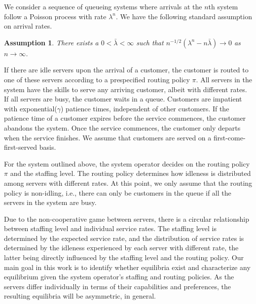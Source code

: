 \documentclass[a4paper,11pt,twoside]{article}
\numberwithin{equation}{section}
\numberwithin{figure}{section}
\theoremstyle{plain}
\newtheorem{assumption}[theorem]{Assumption}
\newcommand{\1}{\mathbbm{1}}
\begin{document}
We consider a sequence of queueing systems where arrivals at the $n$th system follow a Poisson process with rate $\lambda^n$. We have the following standard assumption on arrival rates.
\begin{assumption}\label{asm:lambdascaling}
There exists a $0<\bar{\lambda}<\infty$ such that $n^{-1/2}(\lambda^n-n \bar{\lambda})\to 0$ as $n\to \infty$. 
\end{assumption}
If there are idle servers upon the arrival of a customer, the customer is routed to one of these servers according to a prespecified routing policy $\pi$. All servers in the system have the skills to serve any arriving customer, albeit with different rates. If all servers are busy, the customer waits in a queue. Customers are impatient with exponential($\gamma$) patience times, independent of other customers. If the patience time of a customer expires before the service commences, the customer abandons the system. Once the service commences, the customer only departs when the service finishes. We assume that customers are served on a first-come-first-served basis. 

For the system outlined above, the system operator decides on the routing policy $\pi$ and the staffing level. The routing policy determines how idleness is distributed among servers with different rates. At this point, we only assume that the routing policy is non-idling, i.e., there can only be customers in the queue if all the servers in the system are busy. 

Due to the non-cooperative game between servers, there is a circular relationship between staffing level and individual service rates. 
The staffing level is determined by the expected service rate, and the distribution of service rates is determined by the idleness experienced by each server with different rate, the latter being directly influenced by the staffing level and the routing policy. 
Our main goal in this work is to identify whether equilibria exist and characterize any equilibrium given the system operator's staffing and routing policies. As the servers differ individually in terms of their capabilities and preferences, the resulting equilibria will be asymmetric, in general. 
\end{document}
